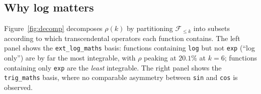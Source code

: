\documentclass[preprint,12pt,authoryear]{elsarticle}
\newcommand{\Fleq}{\mathcal{F}_{\leq k}}
\newcommand{\rhok}{\rho(k)}
\newcommand{\hd}[1]{{\color{red}\textbf{[HD: #1]}}}
\begin{document}
\subsection{Why log matters}
\label{sec:mechanism}

Figure~\ref{fig:decomp} decomposes $\rhok$ by partitioning $\Fleq$ into subsets according to which transcendental operators each function contains. The left panel shows the \texttt{ext\_log\_maths} basis: functions containing \texttt{log} but not \texttt{exp} (``log only'') are by far the most integrable, with $\rho$ peaking at $20.1\%$ at $k=6$; functions containing only \texttt{exp} are the \emph{least} integrable. The right panel shows the \texttt{trig\_maths} basis, where no comparable asymmetry between \texttt{sin} and \texttt{cos} is observed.

%
\end{document}
